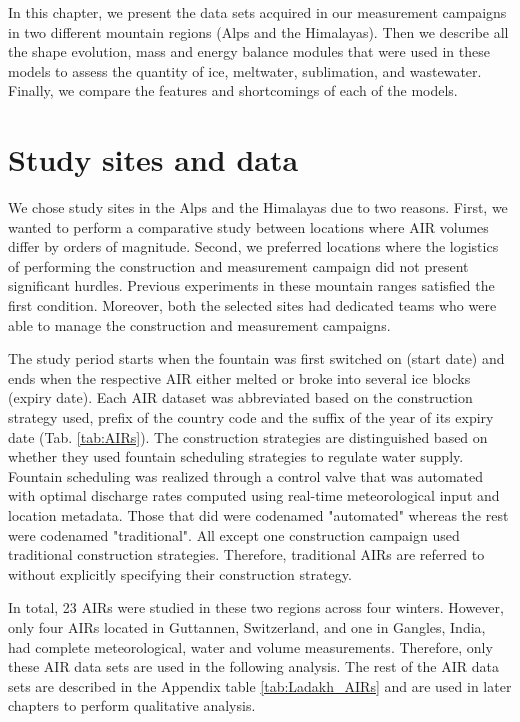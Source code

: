 In this chapter, we present the data sets acquired in our measurement campaigns in two different mountain
regions (Alps and the Himalayas). Then we describe all the shape evolution, mass and energy balance modules that were used
in these models to assess the quantity of ice, meltwater, sublimation, and wastewater. Finally, we compare the
features and shortcomings of each of the models.

\section{Study sites and data}

We chose study sites in the Alps and the Himalayas due to two reasons. First, we wanted to perform a comparative
study between locations where AIR volumes differ by orders of magnitude. Second, we preferred locations where
the logistics of performing the construction and measurement campaign did not present significant hurdles.
Previous experiments in these mountain ranges satisfied the first condition. Moreover, both the selected sites
had dedicated teams who were able to manage the construction and measurement campaigns.

The study period starts when the fountain was first switched on (start date) and ends when the respective AIR
either melted or broke into several ice blocks (expiry date).  Each AIR dataset was abbreviated based on the
construction strategy used, prefix of the country code and the suffix of the year of its expiry date
(Tab. \ref{tab:AIRs}). The construction strategies are distinguished based on whether they used fountain scheduling
strategies to regulate water supply. Fountain scheduling was realized through a control valve that was automated
with optimal discharge rates computed using real-time meteorological input and location metadata. Those that did were
codenamed "automated" whereas the rest were codenamed "traditional". All except one construction campaign used
traditional construction strategies. Therefore, traditional \ac{AIRs} are referred to without explicitly
specifying their construction strategy.

In total, 23 \ac{AIRs} were studied in these two regions across four winters.  However, only four \ac{AIRs} located in
Guttannen, Switzerland, and one in Gangles, India, had complete meteorological, water and volume measurements. Therefore,
only these AIR data sets are used in the following analysis. The rest of the AIR data sets are described in the
Appendix table \ref{tab:Ladakh_AIRs} and are used in later chapters to perform qualitative analysis.

